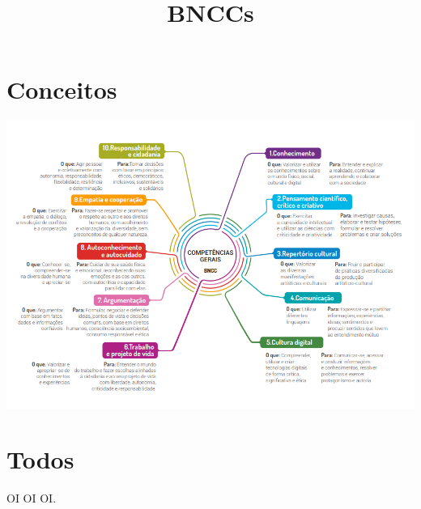 \documentclass[12pt]{extarticle}
\newcommand{\AutorLivro}{}
\newcommand{\TituloLivro}{BNCCs}
\newcommand{\colaborador}{}
\begin{document}
\title{\TituloLivro}
\author{\AutorLivro}
\def\authornotes{\colaborador}

\date{}
\maketitle
\tableofcontents

\section{Conceitos}

\includegraphics[width=1.2\textwidth]{./images/BNCC-01}


\pagebreak
\section{Todos}%
OI OI OI.
\end{document}
